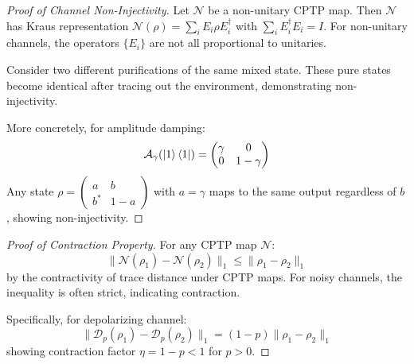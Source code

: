 \documentclass[12pt]{article}
\begin{document}
\begin{proof}[Proof of Channel Non-Injectivity]
Let $\mathcal{N}$ be a non-unitary CPTP map. Then $\mathcal{N}$ has Kraus representation $\mathcal{N}(\rho) = \sum_i E_i \rho E_i^\dagger$ with $\sum_i E_i^\dagger E_i = I$. For non-unitary channels, the operators $\{E_i\}$ are not all proportional to unitaries.

Consider two different purifications of the same mixed state. These pure states become identical after tracing out the environment, demonstrating non-injectivity.

More concretely, for amplitude damping:
\[
\mathcal{A}_\gamma(\ket{1}\bra{1}) = \begin{pmatrix} \gamma & 0 \\ 0 & 1-\gamma \end{pmatrix}
\]
Any state $\rho = \begin{pmatrix} a & b \\ b^* & 1-a \end{pmatrix}$ with $a = \gamma$ maps to the same output regardless of $b$, showing non-injectivity.
\end{proof}

\begin{proof}[Proof of Contraction Property]
For any CPTP map $\mathcal{N}$:
\[
\|\mathcal{N}(\rho_1) - \mathcal{N}(\rho_2)\|_1 \leq \|\rho_1 - \rho_2\|_1
\]
by the contractivity of trace distance under CPTP maps. For noisy channels, the inequality is often strict, indicating contraction.

Specifically, for depolarizing channel:
\[
\|\mathcal{D}_p(\rho_1) - \mathcal{D}_p(\rho_2)\|_1 = (1-p)\|\rho_1 - \rho_2\|_1
\]
showing contraction factor $\eta = 1-p < 1$ for $p > 0$.
\end{proof}
\end{document}

